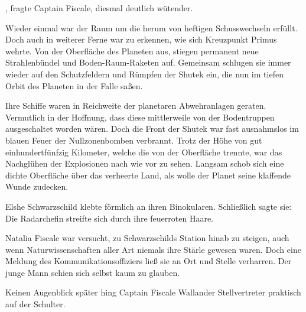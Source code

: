 , fragte Captain Fiscale, diesmal deutlich wütender.

\par

Wieder einmal war der Raum um die  herum von heftigen Schusswechseln erfüllt. Doch auch in weiterer Ferne war zu erkennen, wie sich Kreuzpunkt Primus wehrte. Von der Oberfläche des Planeten aus, stiegen permanent neue Strahlenbündel und Boden-Raum-Raketen auf. Gemeinsam schlugen sie immer wieder auf den Schutzfeldern und Rümpfen der Shutek ein, die nun im tiefen Orbit des Planeten in der Falle saßen.

\par

Ihre Schiffe waren in Reichweite der planetaren Abwehranlagen geraten. Vermutlich in der Hoffnung, dass diese mittlerweile von der Bodentruppen ausgeschaltet worden wären. Doch die Front der Shutek war fast ausnahmslos im blauen Feuer der Nullzonenbomben verbrannt. Trotz der Höhe von gut einhundertfünfzig Kilometer, welche die  von der Oberfläche trennte, war das Nachglühen der Explosionen nach wie vor zu sehen. Langsam schob sich eine dichte Oberfläche über das verheerte Land, als wolle der Planet seine klaffende Wunde zudecken.

\par

Elshe Schwarzschild klebte förmlich an ihren Binokularen. Schließlich sagte sie:  Die Radarchefin streifte sich durch ihre feuerroten Haare. 

\par

Natalia Fiscale war versucht, zu Schwarzschilds Station hinab zu steigen, auch wenn Naturwissenschaften aller Art niemals ihre Stärle gewesen waren. Doch eine Meldung des Kommunikationsoffiziers ließ sie an Ort und Stelle verharren.  Der junge Mann schien sich selbst kaum zu glauben. 

\par

Keinen Augenblick später hing Captain Fiscale Wallander Stellvertreter praktisch auf der Schulter. 

